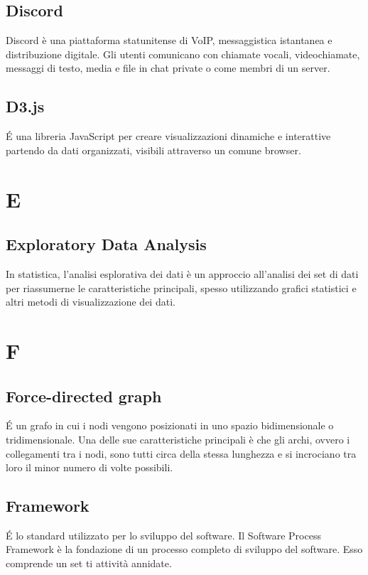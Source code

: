 \subsection{Discord}
Discord è una piattaforma statunitense di VoIP, messaggistica istantanea e distribuzione digitale. Gli utenti comunicano con chiamate vocali, videochiamate, messaggi di testo, media e file in chat private o come membri di un server.

\subsection{D3.js}
\'E una libreria JavaScript per creare visualizzazioni dinamiche e interattive partendo da dati organizzati, visibili attraverso un comune browser.



\newpage
\section{E}
\subsection{Exploratory Data Analysis}
In statistica, l'analisi esplorativa dei dati è un approccio all'analisi dei set di dati per riassumerne le caratteristiche principali, spesso utilizzando grafici statistici e altri metodi di visualizzazione dei dati.

\newpage
\section{F}
\subsection{Force-directed graph}
\'E un grafo in cui i nodi vengono posizionati in uno spazio bidimensionale o tridimensionale. Una delle sue caratteristiche principali è che gli archi, ovvero i collegamenti tra i nodi, sono tutti circa della stessa lunghezza e si incrociano tra loro il minor numero di volte possibili.

\subsection{Framework}
\'E lo standard utilizzato per lo sviluppo del software. Il Software Process Framework è la fondazione di un processo completo di sviluppo
del software. Esso comprende un set ti attività annidate.

